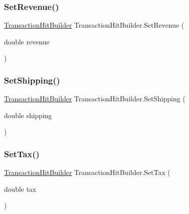 \mbox{\label{class_transaction_hit_builder_a9873c16e4a3a6554c8623ac3b33251a1}} 
\subsubsection{\texorpdfstring{Set\+Revenue()}{SetRevenue()}}
{\footnotesize\ttfamily \hyperlink{class_transaction_hit_builder}{Transaction\+Hit\+Builder} Transaction\+Hit\+Builder.\+Set\+Revenue (\begin{DoxyParamCaption}\item[{double}]{revenue }\end{DoxyParamCaption})}

\mbox{\label{class_transaction_hit_builder_a219cc3ad2eb7ad3e0e45ebcb4bc55e7f}} 
\subsubsection{\texorpdfstring{Set\+Shipping()}{SetShipping()}}
{\footnotesize\ttfamily \hyperlink{class_transaction_hit_builder}{Transaction\+Hit\+Builder} Transaction\+Hit\+Builder.\+Set\+Shipping (\begin{DoxyParamCaption}\item[{double}]{shipping }\end{DoxyParamCaption})}

\mbox{\label{class_transaction_hit_builder_a6de840fc1bc67c7a48849114cf7c62cb}} 
\subsubsection{\texorpdfstring{Set\+Tax()}{SetTax()}}
{\footnotesize\ttfamily \hyperlink{class_transaction_hit_builder}{Transaction\+Hit\+Builder} Transaction\+Hit\+Builder.\+Set\+Tax (\begin{DoxyParamCaption}\item[{double}]{tax }\end{DoxyParamCaption})}

